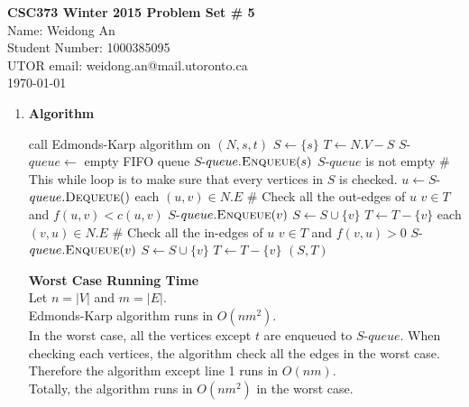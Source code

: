 \documentclass[11pt]{article}
\begin{document}
\begin{center}
{\bf \Large \bf CSC373 Winter 2015 Problem Set \# 5}\\
Name: Weidong An\\
Student Number: 1000385095\\
UTOR email: weidong.an@mail.utoronto.ca\\
\today\\
\end{center}

\begin{enumerate}[label=(\alph*)]

\item
{\bf Algorithm}
\begin{codebox}
\li call Edmonds-Karp algorithm on $(N, s, t)$
\li $S \gets \{s\}$
\li $T \gets N.V - S$
\li $S$-$queue \gets$ empty FIFO queue
\li $S$-$queue.\textnormal{\scshape Enqueue}(s)$
\li \While $S$-$queue$ is not empty \# This while loop is to make sure that every vertices in $S$ is checked.
\li      \Then $u \gets S$-$queue.\textnormal{\scshape Dequeue}()$
\li            \For each $(u, v) \in N.E$  \# Check all the out-edges of $u$
\li                          \Then \If $v \in T$ and $f(u, v) < c(u, v)$
\li                                  \Then $S$-$queue.\textnormal{\scshape Enqueue}(v)$
\li                                         $S\gets S \cup \{v\}$
\li                                         $T\gets T - \{v\}$\End\End
\li             \For each $(v, u) \in N.E$ \# Check all the in-edges of $u$
\li                    \Then \If $v \in T$ and $f(v, u) > 0$
\li                             \Then $S$-$queue.\textnormal{\scshape Enqueue}(v)$
\li                                   $S\gets S \cup \{v\}$
\li                                         $T\gets T - \{v\}$\End\End\End
\li \Return $(S, T)$
\end{codebox}

{\bf Worst Case Running Time}\\
Let $n = |V|$ and $m = |E|$.\\
Edmonds-Karp algorithm runs in $O(nm^2)$.\\
In the worst case, all the vertices except $t$ are enqueued to $S$-$queue$. When checking each vertices, the algorithm check all the edges in the worst case. Therefore the algorithm except line 1 runs in $O(nm)$.\\
Totally, the algorithm runs in $O(nm^2)$ in the worst case.


\end{enumerate}
\end{document}
